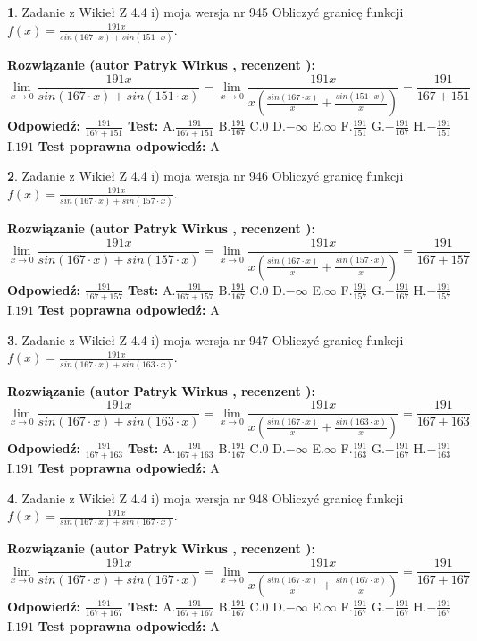 \documentclass[12pt, a4paper]{article}
\theoremstyle{definition} %
\newtheorem{zad}{}
\newcommand{\zadStart}[1]{\begin{zad}#1\newline}
\newcommand{\zadStop}{\end{zad}}
\newcommand{\rozwStart}[2]{\noindent \textbf{Rozwiązanie (autor #1 , recenzent #2): }\newline}
\newcommand{\rozwStop}{\newline}
\newcommand{\odpStart}{\noindent \textbf{Odpowiedź:}\newline}
\newcommand{\odpStop}{\newline}
\newcommand{\testStart}{\noindent \textbf{Test:}\newline}
\newcommand{\testStop}{\newline}
\newcommand{\kluczStart}{\noindent \textbf{Test poprawna odpowiedź:}\newline}
\newcommand{\kluczStop}{\newline}
\begin{document}
\zadStart{Zadanie z Wikieł Z 4.4 i) moja wersja nr 945}
Obliczyć granicę funkcji $f(x)=\frac{191x}{sin(167\cdot x) +sin(151\cdot x)}$.
\zadStop
\rozwStart{Patryk Wirkus}{}
$$\lim\limits_{x\to 0}\frac{191x}{sin(167\cdot x) +sin(151\cdot x)}=\lim\limits_{x\to 0}\frac{191x}{x(\frac{sin(167\cdot x)}{x}+\frac{sin(151\cdot x)}{x})}=\frac{191}{167+151}$$
\rozwStop
\odpStart
$\frac{191}{167+151}$
\odpStop
\testStart
A.$\frac{191}{167+151}$
B.$\frac{191}{167}$
C.$0$
D.$-\infty$
E.$\infty$
F.$\frac{191}{151}$
G.$-\frac{191}{167}$
H.$-\frac{191}{151}$
I.$191$
\testStop
\kluczStart
A
\kluczStop



\zadStart{Zadanie z Wikieł Z 4.4 i) moja wersja nr 946}
Obliczyć granicę funkcji $f(x)=\frac{191x}{sin(167\cdot x) +sin(157\cdot x)}$.
\zadStop
\rozwStart{Patryk Wirkus}{}
$$\lim\limits_{x\to 0}\frac{191x}{sin(167\cdot x) +sin(157\cdot x)}=\lim\limits_{x\to 0}\frac{191x}{x(\frac{sin(167\cdot x)}{x}+\frac{sin(157\cdot x)}{x})}=\frac{191}{167+157}$$
\rozwStop
\odpStart
$\frac{191}{167+157}$
\odpStop
\testStart
A.$\frac{191}{167+157}$
B.$\frac{191}{167}$
C.$0$
D.$-\infty$
E.$\infty$
F.$\frac{191}{157}$
G.$-\frac{191}{167}$
H.$-\frac{191}{157}$
I.$191$
\testStop
\kluczStart
A
\kluczStop



\zadStart{Zadanie z Wikieł Z 4.4 i) moja wersja nr 947}
Obliczyć granicę funkcji $f(x)=\frac{191x}{sin(167\cdot x) +sin(163\cdot x)}$.
\zadStop
\rozwStart{Patryk Wirkus}{}
$$\lim\limits_{x\to 0}\frac{191x}{sin(167\cdot x) +sin(163\cdot x)}=\lim\limits_{x\to 0}\frac{191x}{x(\frac{sin(167\cdot x)}{x}+\frac{sin(163\cdot x)}{x})}=\frac{191}{167+163}$$
\rozwStop
\odpStart
$\frac{191}{167+163}$
\odpStop
\testStart
A.$\frac{191}{167+163}$
B.$\frac{191}{167}$
C.$0$
D.$-\infty$
E.$\infty$
F.$\frac{191}{163}$
G.$-\frac{191}{167}$
H.$-\frac{191}{163}$
I.$191$
\testStop
\kluczStart
A
\kluczStop



\zadStart{Zadanie z Wikieł Z 4.4 i) moja wersja nr 948}
Obliczyć granicę funkcji $f(x)=\frac{191x}{sin(167\cdot x) +sin(167\cdot x)}$.
\zadStop
\rozwStart{Patryk Wirkus}{}
$$\lim\limits_{x\to 0}\frac{191x}{sin(167\cdot x) +sin(167\cdot x)}=\lim\limits_{x\to 0}\frac{191x}{x(\frac{sin(167\cdot x)}{x}+\frac{sin(167\cdot x)}{x})}=\frac{191}{167+167}$$
\rozwStop
\odpStart
$\frac{191}{167+167}$
\odpStop
\testStart
A.$\frac{191}{167+167}$
B.$\frac{191}{167}$
C.$0$
D.$-\infty$
E.$\infty$
F.$\frac{191}{167}$
G.$-\frac{191}{167}$
H.$-\frac{191}{167}$
I.$191$
\testStop
\kluczStart
A
\kluczStop
\end{document}
